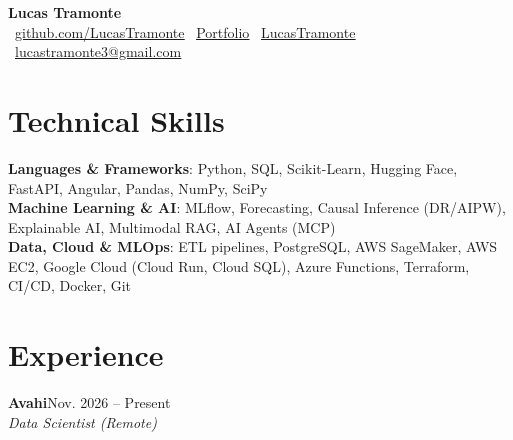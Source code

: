 \documentclass[10pt,letterpaper]{article}
\newcommand{\entry}[4]{%
  \textbf{#1}\hfill #2\\[-1pt]
  \textit{#3}\hfill #4\par\vspace{1pt}}
\begin{document}
\begin{center}
  {\Huge \textbf{Lucas Tramonte}}\\[6pt]
  \small
  \faGithub\ \href{https://github.com/LucasTramonte}{\underline{github.com/LucasTramonte}} \quad
  \faFile\ \href{https://lucastramonte.github.io/}{\underline{Portfolio}} \quad
  \faLinkedin\ \href{https://www.linkedin.com/in/lucastramonte01/}{\underline{LucasTramonte}} \quad
  \faEnvelope\ \href{mailto:lucastramonte3@gmail.com}{\underline{lucastramonte3@gmail.com}}
\end{center}

\section{Technical Skills}
\small
\textbf{Languages \& Frameworks}: Python, SQL, Scikit-Learn, Hugging Face, FastAPI, Angular, Pandas, NumPy, SciPy\\
\textbf{Machine Learning \& AI}: MLflow, Forecasting, Causal Inference (DR/AIPW), Explainable AI, Multimodal RAG, AI Agents (MCP)\\
\textbf{Data, Cloud \& MLOps}: ETL pipelines, PostgreSQL, AWS SageMaker, AWS EC2, Google Cloud (Cloud Run, Cloud SQL), Azure Functions, Terraform, CI/CD, Docker, Git

\section{Experience}
\small
\entry{Avahi}{Nov. 2026 -- Present}{Data Scientist (Remote)}{}
\vspace{2pt}
\end{document}
